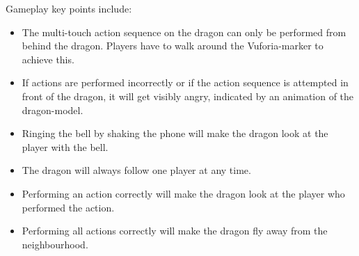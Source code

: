 \documentclass{sigchi-ext}
\begin{document}
Gameplay key points include:

\begin{itemize}\compresslist%
\item The multi-touch action sequence on the dragon can only be performed from behind the dragon. Players have to walk around the Vuforia-marker to achieve this.
\item If actions are performed incorrectly or if the action sequence is attempted in front of the dragon, it will get visibly angry, indicated by an animation of the dragon-model.
\item Ringing the bell by shaking the phone will make the dragon look at the player with the bell.
\item The dragon will always follow one player at any time.
\item Performing an action correctly will make the dragon look at the player who performed the action.
\item Performing all actions correctly will make the dragon fly away from the neighbourhood.
\end{itemize}


\balance{} 



\end{document}
